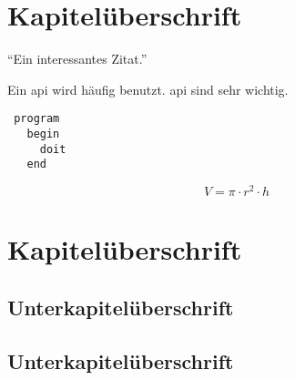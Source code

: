 \documentclass{custom}
\begin{document}
\begin{frontmatter}

\mycover
\myconfidentiality
\mytableofcontents
\mylistoffigures
\mylistoftables
\mylistofacronyms

\end{frontmatter}

\begin{mainmatter}

\section{Kapitelüberschrift}

\enquote{Ein interessantes Zitat.} \cite[1]{test}

Ein \gls{api} wird häufig benutzt. \gls{api} sind sehr wichtig.

\begin{verbatim}
 program
   begin
     doit
   end
\end{verbatim}

\begin{equation}
V= \pi \cdot r^{2} \cdot h
\end{equation}

\lipsum

\section{Kapitelüberschrift}

\lipsum

\subsection{Unterkapitelüberschrift}

\lipsum

\subsection{Unterkapitelüberschrift}

\lipsum

\end{mainmatter}

\begin{backmatter}

\mylistofappendices



\mybibliography
\mydeclaration

\end{backmatter}
\end{document}
